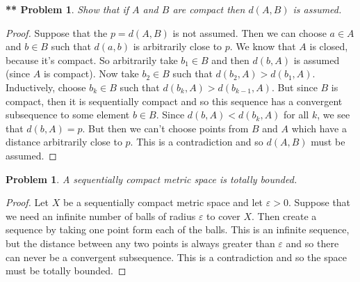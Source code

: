 \documentclass{article}
\newtheorem{problem}{Problem}
\newtheorem{**}{** Problem}
\begin{document}
\begin{flushleft}
\begin{**}
Show that if $A$ and $B$ are compact then $d(A,B)$ is assumed.
\end{**}
\begin{proof}
Suppose that the $p = d(A, B)$ is not assumed. Then we can choose $a \in A$ and $b \in B$ such that $d(a, b)$ is arbitrarily close to $p$. We know that $A$ is closed, because it's compact. So arbitrarily take $b_1 \in B$ and then $d(b, A)$ is assumed (since $A$ is compact). Now take $b_2 \in B$ such that $d(b_2, A) > d(b_1,	 A)$. Inductively, choose $b_k \in B$ such that $d(b_k, A) > d(b_{k-1}, A)$. But since $B$ is compact, then it is sequentially compact and so this sequence has a convergent subsequence to some element $b \in B$. Since $d(b, A) < d(b_k, A)$ for all $k$, we see that $d(b, A) = p$. But then we can't choose points from $B$ and $A$ which have a distance arbitrarily close to $p$. This is a contradiction and so $d(A, B)$ must be assumed.
\end{proof}

\begin{problem}
A sequentially compact metric space is totally bounded.
\end{problem}
\begin{proof}
Let $X$ be a sequentially compact metric space and let $\varepsilon > 0$. Suppose that we need an infinite number of balls of radius $\varepsilon$ to cover $X$. Then create a sequence by taking one point form each of the balls. This is an infinite sequence, but the distance between any two points is always greater than $\varepsilon$ and so there can never be a convergent subsequence. This is a contradiction and so the space must be totally bounded.
\end{proof}


\end{flushleft}
\end{document}
